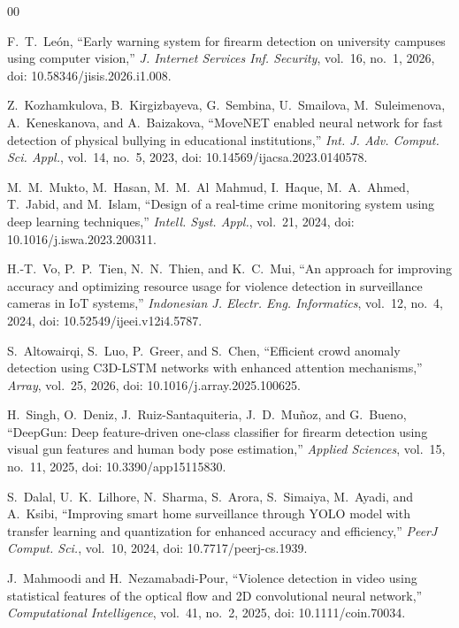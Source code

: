 \documentclass[conference]{IEEEtran}
\begin{document}
\begin{thebibliography}{00}

 F.~T.~Le\'{o}n, ``Early warning system for firearm detection on university campuses using computer vision,'' \textit{J. Internet Services Inf. Security}, vol.~16, no.~1, 2026, doi: 10.58346/jisis.2026.i1.008.

 Z.~Kozhamkulova, B.~Kirgizbayeva, G.~Sembina, U.~Smailova, M.~Suleimenova, A.~Keneskanova, and A.~Baizakova, ``MoveNET enabled neural network for fast detection of physical bullying in educational institutions,'' \textit{Int. J. Adv. Comput. Sci. Appl.}, vol.~14, no.~5, 2023, doi: 10.14569/ijacsa.2023.0140578.

 M.~M.~Mukto, M.~Hasan, M.~M.~Al~Mahmud, I.~Haque, M.~A.~Ahmed, T.~Jabid, and M.~Islam, ``Design of a real-time crime monitoring system using deep learning techniques,'' \textit{Intell. Syst. Appl.}, vol.~21, 2024, doi: 10.1016/j.iswa.2023.200311.

 H.-T.~Vo, P.~P.~Tien, N.~N.~Thien, and K.~C.~Mui, ``An approach for improving accuracy and optimizing resource usage for violence detection in surveillance cameras in IoT systems,'' \textit{Indonesian J. Electr. Eng. Informatics}, vol.~12, no.~4, 2024, doi: 10.52549/ijeei.v12i4.5787.

 S.~Altowairqi, S.~Luo, P.~Greer, and S.~Chen, ``Efficient crowd anomaly detection using C3D-LSTM networks with enhanced attention mechanisms,'' \textit{Array}, vol.~25, 2026, doi: 10.1016/j.array.2025.100625.

 H.~Singh, O.~Deniz, J.~Ruiz-Santaquiteria, J.~D.~Mu\~{n}oz, and G.~Bueno, ``DeepGun: Deep feature-driven one-class classifier for firearm detection using visual gun features and human body pose estimation,'' \textit{Applied Sciences}, vol.~15, no.~11, 2025, doi: 10.3390/app15115830.

 S.~Dalal, U.~K.~Lilhore, N.~Sharma, S.~Arora, S.~Simaiya, M.~Ayadi, and A.~Ksibi, ``Improving smart home surveillance through YOLO model with transfer learning and quantization for enhanced accuracy and efficiency,'' \textit{PeerJ Comput. Sci.}, vol.~10, 2024, doi: 10.7717/peerj-cs.1939.

 J.~Mahmoodi and H.~Nezamabadi-Pour, ``Violence detection in video using statistical features of the optical flow and 2D convolutional neural network,'' \textit{Computational Intelligence}, vol.~41, no.~2, 2025, doi: 10.1111/coin.70034.


\end{thebibliography}
\end{document}
